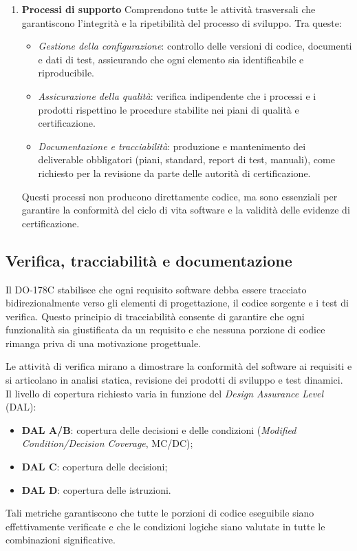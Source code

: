 \documentclass[italian, Lau, oneside]{sapthesis} %
\begin{document}
\begin{enumerate}
    \item \textbf{Processi di supporto}  
    Comprendono tutte le attività trasversali che garantiscono l’integrità e la ripetibilità del processo di sviluppo.  
    Tra queste:
    \begin{itemize}
        \item \emph{Gestione della configurazione}: controllo delle versioni di codice, documenti e dati di test, assicurando che ogni elemento sia identificabile e riproducibile.
        \item \emph{Assicurazione della qualità}: verifica indipendente che i processi e i prodotti rispettino le procedure stabilite nei piani di qualità e certificazione.
        \item \emph{Documentazione e tracciabilità}: produzione e mantenimento dei deliverable obbligatori (piani, standard, report di test, manuali), come richiesto per la revisione da parte delle autorità di certificazione.
    \end{itemize}
    Questi processi non producono direttamente codice, ma sono essenziali per garantire la conformità del ciclo di vita software e la validità delle evidenze di certificazione.
\end{enumerate}

\subsection{Verifica, tracciabilità e documentazione}

Il DO-178C stabilisce che ogni requisito software debba essere tracciato bidirezionalmente verso gli elementi di progettazione, il codice sorgente e i test di verifica.  
Questo principio di tracciabilità consente di garantire che ogni funzionalità sia giustificata da un requisito e che nessuna porzione di codice rimanga priva di una motivazione progettuale.

Le attività di verifica mirano a dimostrare la conformità del software ai requisiti e si articolano in analisi statica, revisione dei prodotti di sviluppo e test dinamici.  
Il livello di copertura richiesto varia in funzione del \emph{Design Assurance Level} (DAL):
\begin{itemize}
    \item \textbf{DAL A/B}: copertura delle decisioni e delle condizioni (\emph{Modified Condition/Decision Coverage}, MC/DC);
    \item \textbf{DAL C}: copertura delle decisioni;
    \item \textbf{DAL D}: copertura delle istruzioni.
\end{itemize}
Tali metriche garantiscono che tutte le porzioni di codice eseguibile siano effettivamente verificate e che le condizioni logiche siano valutate in tutte le combinazioni significative.
\end{document}
